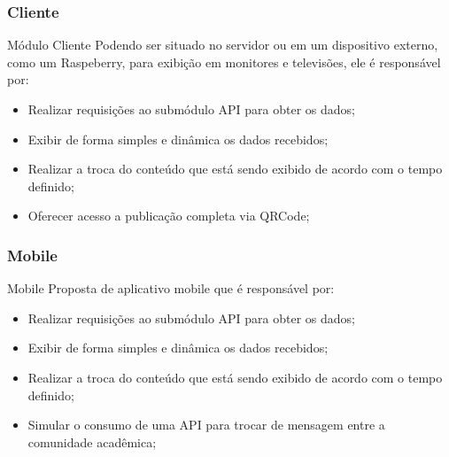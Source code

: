 \documentclass{aula-ifb}
\begin{document}
\subsubsection{Cliente}
\begin{frame}{Módulo Cliente}
Podendo ser situado no servidor ou em um dispositivo externo, como um Raspeberry, para exibição em monitores e televisões, ele é responsável por:
\begin{itemize}
   \item Realizar requisições ao submódulo API para obter os dados;
   \vspace{10px}
   \item Exibir de forma simples e dinâmica os dados recebidos;
   \vspace{10px}
   \item Realizar a troca do conteúdo que está sendo exibido de acordo com o tempo definido;
   \vspace{10px}
   \item Oferecer acesso a publicação completa via QRCode;
\end{itemize}
\end{frame}

\subsubsection{Mobile}
\begin{frame}{Mobile}
Proposta de aplicativo mobile que é responsável por:
\begin{itemize}
   \item Realizar requisições ao submódulo API para obter os dados;
   \vspace{10px}
   \item Exibir de forma simples e dinâmica os dados recebidos;
   \vspace{10px}
   \item Realizar a troca do conteúdo que está sendo exibido de acordo com o tempo definido;
   \vspace{10px}
   \item Simular o consumo de uma API para trocar de mensagem entre a comunidade acadêmica;
\end{itemize}
\end{frame}
\end{document}
